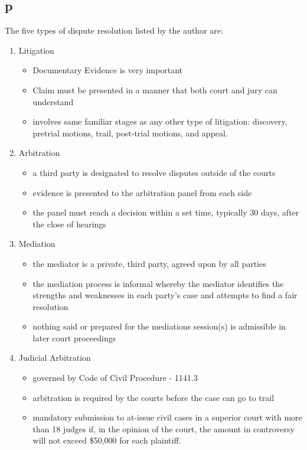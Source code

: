 \documentclass[12pt]{article} %
\begin{document}
	\subsection{p}
		The five types of dispute resolution listed by the author are:
			\begin{enumerate}
				\item Litigation
					\begin{itemize}
						\item Documentary Evidence is very important
						\item Claim must be presented in a manner that both court and jury can understand
						\item involves same familiar stages as any other type of litigation: discovery, pretrial motions, trail, post-trial motions, and appeal.
					\end{itemize}
				\item Arbitration
					\begin{itemize}
						\item a third party is designated to resolve disputes outside of the courts
						\item evidence is presented to the arbitration panel from each side
						\item the panel must reach a decision within a set time, typically 30 days, after the close of hearings
					\end{itemize}
				\item Mediation
					\begin{itemize}
						\item the mediator is a private, third party, agreed upon by all parties
						\item the mediation process is informal whereby the mediator identifies the strengths and weaknesses in each party's case and attempts to find a fair resolution
						\item nothing said or prepared for the mediations session(s) is admissible in later court proceedings
					\end{itemize}
				\item Judicial Arbitration
					\begin{itemize}
						\item governed by Code of Civil Procedure  - 1141.3
						\item arbitration is required by the courts before the case can go to trail
						\item mandatory submission to at-issue civil cases in a superior court with more than 18 judges if, in the opinion of the court, the amount in controversy will not exceed \$50,000 for each plaintiff.

\end{itemize}
\end{enumerate}
\end{document}
